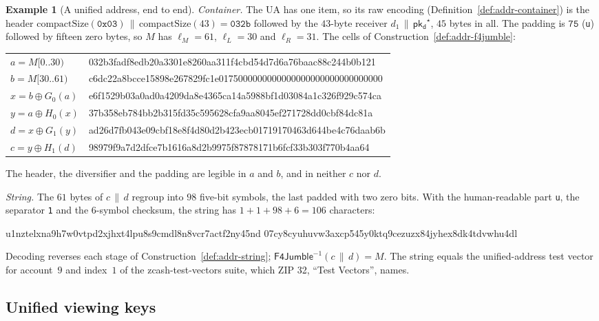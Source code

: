 \documentclass[11pt,a4paper]{article}
\theoremstyle{definition}
\newtheorem{example}[theorem]{Example}
\newcommand{\pkd}{\ensuremath{\mathsf{pk_d}}}
\begin{document}
\begin{example}[A unified address, end to end]
\emph{Container.} The UA has one item, so its raw encoding
(Definition~\ref{def:addr-container}) is the header
$\mathrm{compactSize}(\mathtt{0x03}) \,\|\, \mathrm{compactSize}(43) =
\mathtt{032b}$ followed by the $43$-byte receiver $d_1 \,\|\,
\pkd^{\star}$, $45$ bytes in all. The padding is $\mathtt{75}$
(\texttt{u}) followed by fifteen zero bytes, so $M$ has $\ell_M = 61$,
$\ell_L = 30$ and $\ell_R = 31$. The cells of
Construction~\ref{def:addr-f4jumble}:
\begin{center}\footnotesize\ttfamily
\begin{tabular}{@{}l@{\quad}l@{}}
$a = M[0..30)$ & 032b3fadf8edb20a3301e8260aa311f4cbd54d7d6a76baac88c244b0b121 \\
$b = M[30..61)$
  & c6dc22a8bcce15898e267829fc1e0175000000000000000000000000000000 \\
$x = b \oplus G_0(a)$
  & e6f1529b03a0ad0a4209da8e4365ca14a5988bf1d03084a1c326f929c574ca \\
$y = a \oplus H_0(x)$
  & 37b358eb784bb2b315fd35c595628cfa9aa8045ef271728dd0cbf84dc81a \\
$d = x \oplus G_1(y)$
  & ad26d7fb043e09cbf18e8f4d80d2b423ecb01719170463d644be4c76daab6b \\
$c = y \oplus H_1(d)$
  & 98979f9a7d2dfce7b1616a8d2b9975f87878171b6fcf33b303f770b4aa64 \\
\end{tabular}
\end{center}
The header, the diversifier and the padding are legible in $a$ and $b$,
and in neither $c$ nor $d$.

\emph{String.} The $61$ bytes of $c \,\|\, d$ regroup into $98$ five-bit
symbols, the last padded with two zero bits. With the human-readable part
\texttt{u}, the separator \texttt{1} and the $6$-symbol checksum, the
string has $1 + 1 + 98 + 6 = 106$ characters:
\begin{center}\scriptsize\ttfamily
u1nztelxna9h7w0vtpd2xjhxt4lpu8s9cmdl8n8vcr7actf2ny45nd\allowbreak
07cy8cyuhuvw3axcp545y0ktq9cezuzx84jyhex8dk4tdvwhu4dl
\end{center}
Decoding reverses each stage of Construction~\ref{def:addr-string};
$\mathsf{F4Jumble}^{-1}(c \,\|\, d) = M$. The string equals the unified-address
test vector for account~$9$ and index~$1$ of the zcash-test-vectors suite,
which ZIP 32, ``Test Vectors'', names.
\end{example}

\subsection{Unified viewing keys}\label{sec:addr-uvk}
\end{document}
